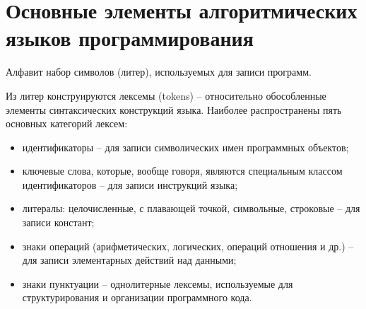 \documentclass{beamer}
\begin{document}
\section{Основные элементы алгоритмических языков программирования}
\begin{frame}
\begin{block}{Алфавит}
набор символов (литер), используемых для записи программ.
\end{block}
Из литер конструируются лексемы (tokens) – относительно обособленные элементы синтаксических конструкций языка. Наиболее распространены пять основных категорий лексем:
\begin{itemize}
\item идентификаторы – для записи символических имен программных объектов;
\item ключевые слова, которые, вообще говоря, являются специальным классом идентификаторов – для записи инструкций языка;
\item литералы: целочисленные, с плавающей точкой, символьные, строковые – для записи констант;
\item знаки операций (арифметических, логических, операций отношения и др.) – для записи элементарных действий над данными;
\item знаки пунктуации – однолитерные лексемы, используемые для
структурирования и организации программного кода.
\end{itemize}
\end{frame}
\end{document}
